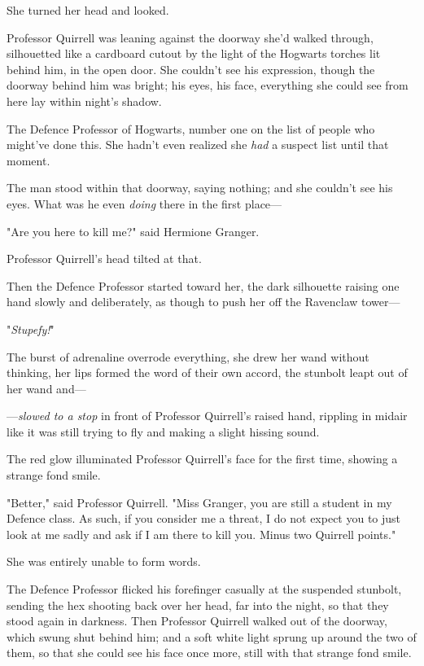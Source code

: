 She turned her head and looked.

Professor Quirrell was leaning against the doorway she'd walked through,
silhouetted like a cardboard cutout by the light of the Hogwarts torches lit
behind him, in the open door. She couldn't see his expression, though the
doorway behind him was bright; his eyes, his face, everything she could see
from here lay within night's shadow.

The Defence Professor of Hogwarts, number one on the list of people who
might've done this. She hadn't even realized she \emph{had} a suspect list
until that moment.

The man stood within that doorway, saying nothing; and she couldn't see his
eyes. What was he even \emph{doing} there in the first place---

"Are you here to kill me?" said Hermione Granger.

Professor Quirrell's head tilted at that.

Then the Defence Professor started toward her, the dark silhouette raising one
hand slowly and deliberately, as though to push her off the Ravenclaw tower---

"\emph{Stupefy!}"

The burst of adrenaline overrode everything, she drew her wand without
thinking, her lips formed the word of their own accord, the stunbolt leapt out
of her wand and---

---\emph{slowed to a stop} in front of Professor Quirrell's raised hand,
rippling in midair like it was still trying to fly and making a slight hissing
sound.

The red glow illuminated Professor Quirrell's face for the first time, showing
a strange fond smile.

"Better," said Professor Quirrell. "Miss Granger, you are still a student in my
Defence class. As such, if you consider me a threat, I do not expect you to
just look at me sadly and ask if I am there to kill you. Minus two Quirrell
points."

She was entirely unable to form words.

The Defence Professor flicked his forefinger casually at the suspended
stunbolt, sending the hex shooting back over her head, far into the night, so
that they stood again in darkness. Then Professor Quirrell walked out of the
doorway, which swung shut behind him; and a soft white light sprung up around
the two of them, so that she could see his face once more, still with that
strange fond smile.


